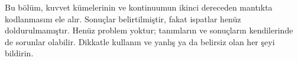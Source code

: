


\begin{editorial}
Bu bölüm, kuvvet kümelerinin ve kontinuumun ikinci dereceden mantıkta
kodlanmasını ele alır. Sonuçlar belirtilmiştir, fakat ispatlar henüz
doldurulmamıştır. Henüz problem yoktur; tanımların ve sonuçların kendilerinde
de sorunlar olabilir. Dikkatle kullanın ve yanlış ya da belirsiz olan her
şeyi bildirin.
\end{editorial}





\OLEndChapterHook

